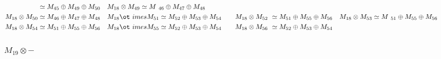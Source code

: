 \begin{align*}
{} \simeq M_{45} \oplus M_{49} \oplus M_{50} &&& M_{18} \otimes M_{49} \simeq M\
_{46} \oplus M_{47} \oplus M_{48}\\
M_{18} \otimes M_{50} \simeq M_{46} \oplus M_{47} \oplus M_{48} &&& M_{18} \ot\
imes M_{51} \simeq M_{52} \oplus M_{53} \oplus M_{54} &&& M_{18} \otimes M_{52\
} \simeq M_{51} \oplus M_{55} \oplus M_{56} &&& M_{18} \otimes M_{53} \simeq M\
_{51} \oplus M_{55} \oplus M_{56}\\
M_{18} \otimes M_{54} \simeq M_{51} \oplus M_{55} \oplus M_{56} &&& M_{18} \ot\
imes M_{55} \simeq M_{52} \oplus M_{53} \oplus M_{54} &&& M_{18} \otimes M_{56\
} \simeq M_{52} \oplus M_{53} \oplus M_{54}\\
\end{align*}

\subsubsection{$M_19\otimes -$}
